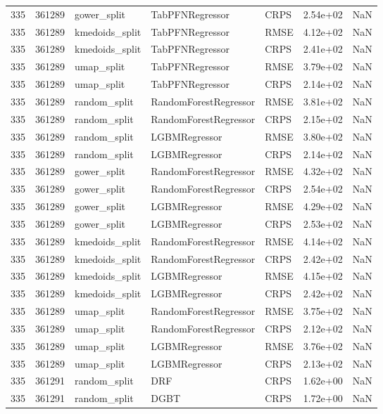 \begin{tabular}{rrlllrr}
335 & 361289 & gower\_split & TabPFNRegressor & CRPS & 2.54e+02 & NaN \\
335 & 361289 & kmedoids\_split & TabPFNRegressor & RMSE & 4.12e+02 & NaN \\
335 & 361289 & kmedoids\_split & TabPFNRegressor & CRPS & 2.41e+02 & NaN \\
335 & 361289 & umap\_split & TabPFNRegressor & RMSE & 3.79e+02 & NaN \\
335 & 361289 & umap\_split & TabPFNRegressor & CRPS & 2.14e+02 & NaN \\
335 & 361289 & random\_split & RandomForestRegressor & RMSE & 3.81e+02 & NaN \\
335 & 361289 & random\_split & RandomForestRegressor & CRPS & 2.15e+02 & NaN \\
335 & 361289 & random\_split & LGBMRegressor & RMSE & 3.80e+02 & NaN \\
335 & 361289 & random\_split & LGBMRegressor & CRPS & 2.14e+02 & NaN \\
335 & 361289 & gower\_split & RandomForestRegressor & RMSE & 4.32e+02 & NaN \\
335 & 361289 & gower\_split & RandomForestRegressor & CRPS & 2.54e+02 & NaN \\
335 & 361289 & gower\_split & LGBMRegressor & RMSE & 4.29e+02 & NaN \\
335 & 361289 & gower\_split & LGBMRegressor & CRPS & 2.53e+02 & NaN \\
335 & 361289 & kmedoids\_split & RandomForestRegressor & RMSE & 4.14e+02 & NaN \\
335 & 361289 & kmedoids\_split & RandomForestRegressor & CRPS & 2.42e+02 & NaN \\
335 & 361289 & kmedoids\_split & LGBMRegressor & RMSE & 4.15e+02 & NaN \\
335 & 361289 & kmedoids\_split & LGBMRegressor & CRPS & 2.42e+02 & NaN \\
335 & 361289 & umap\_split & RandomForestRegressor & RMSE & 3.75e+02 & NaN \\
335 & 361289 & umap\_split & RandomForestRegressor & CRPS & 2.12e+02 & NaN \\
335 & 361289 & umap\_split & LGBMRegressor & RMSE & 3.76e+02 & NaN \\
335 & 361289 & umap\_split & LGBMRegressor & CRPS & 2.13e+02 & NaN \\
335 & 361291 & random\_split & DRF & CRPS & 1.62e+00 & NaN \\
335 & 361291 & random\_split & DGBT & CRPS & 1.72e+00 & NaN \\

\end{tabular}
